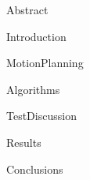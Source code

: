 {Abstract}

\graphicspath{{./1-Introduction/Images/}}
{Introduction}

\graphicspath{{./2-MotionPlanning/Images/}}
{MotionPlanning}

\graphicspath{{./3-Algorithms/Images/}}
{Algorithms}

\graphicspath{{./4-TestDiscussion/Images/}}
{TestDiscussion}

\graphicspath{{./5-Results/Images/}}
{Results}

\graphicspath{{./6-Conclusions/Images/}}
{Conclusions}
